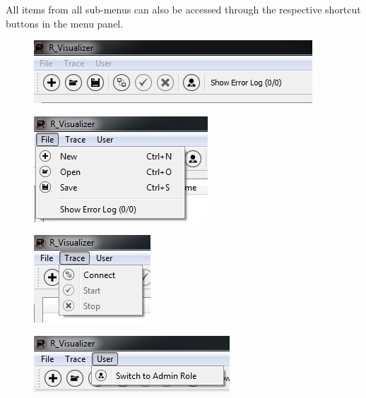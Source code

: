 \documentclass[12pt,a4paper]{scrartcl}
\begin{document}
All items from all sub-menus can also be accessed through the respective shortcut buttons in the menu panel.

\begin{figure}
	\centering
	\includegraphics[width=0.7\linewidth,keepaspectratio]{Graphics/Menu}
	\caption[Menu]{}
	\label{fig:menu}
\end{figure}
\begin{figure}
	\centering
	\includegraphics[width=0.55\linewidth,keepaspectratio]{Graphics/MenuFile}
	\caption[File Menu]{}
	\label{fig:menuFile}
\end{figure}
\begin{figure}
	\centering
	\includegraphics[width=0.5\linewidth,keepaspectratio]{Graphics/MenuTrace}
	\caption[Trace Menu]{}
	\label{fig:menuTrace}
\end{figure}
\begin{figure}
	\centering
	\includegraphics[width=0.6\linewidth,keepaspectratio]{Graphics/MenuUser}
	\caption[User Menu]{}
	\label{fig:menuUser}
\end{figure}
\end{document}
